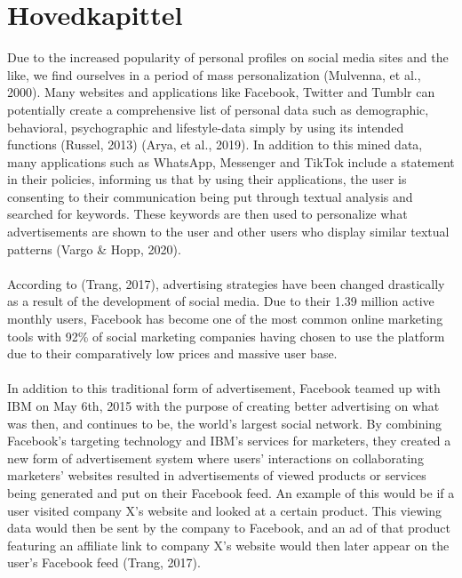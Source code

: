\documentclass[11pt]{article}
\begin{document}
\section{Hovedkapittel}


Due to the increased popularity of personal profiles on social media sites and the like, we find ourselves in a period of mass personalization (Mulvenna, et al., 2000). Many websites and applications like Facebook, Twitter and Tumblr can potentially create a comprehensive list of personal data such as demographic, behavioral, psychographic and lifestyle-data simply by using its intended functions (Russel, 2013) (Arya, et al., 2019). In addition to this mined data, many applications such as WhatsApp, Messenger and TikTok include a statement in their policies, informing us that by using their applications, the user is consenting to their communication being put through textual analysis and searched for keywords. These keywords are then used to personalize what advertisements are shown to the user and other users who display similar textual patterns (Vargo \& Hopp, 2020). \\ \\

According to (Trang, 2017), advertising strategies have been changed drastically as a result of the development of social media. Due to their 1.39 million active monthly users, Facebook has become one of the most common online marketing tools with 92\% of social marketing companies having chosen to use the platform due to their comparatively low prices and massive user base.  \\ \\

In addition to this traditional form of advertisement, Facebook teamed up with IBM on May 6th, 2015 with the purpose of creating better advertising on what was then, and continues to be, the world’s largest social network. By combining Facebook’s targeting technology and IBM’s services for marketers, they created a new form of advertisement system where users’ interactions on collaborating marketers’ websites resulted in advertisements of viewed products or services being generated and put on their Facebook feed. An example of this would be if a user visited company X’s website and looked at a certain product. This viewing data would then be sent by the company to Facebook, and an ad of that product featuring an affiliate link to company X’s website would then later appear on the user’s Facebook feed (Trang, 2017).  \\ \\
\end{document}
